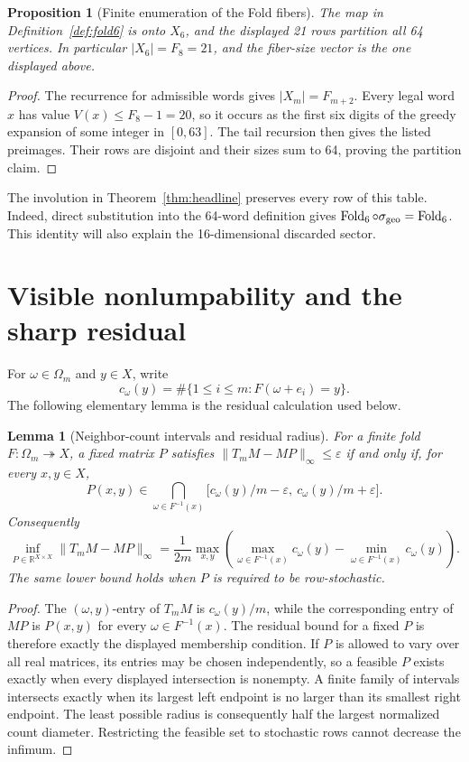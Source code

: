 \documentclass[12pt,a4paper]{article}
\theoremstyle{plain}
\newtheorem{proposition}[theorem]{Proposition}
\newtheorem{lemma}[theorem]{Lemma}
\theoremstyle{definition}
\numberwithin{equation}{section}
\newcommand{\Fold}{\operatorname{Fold}}
\newcommand{\RR}{\mathbb R}
\begin{document}
\begin{proposition}[Finite enumeration of the Fold fibers]\label{prop:fiber-enumeration}
The map in Definition~\ref{def:fold6} is onto \(X_6\), and the displayed 21 rows
partition all 64 vertices.  In particular \(|X_6|=F_8=21\), and the fiber-size vector
is the one displayed above.
\end{proposition}
\begin{proof}
The recurrence for admissible words gives \(|X_m|=F_{m+2}\).  Every legal word \(x\)
has value \(V(x)\le F_8-1=20\), so it occurs as the first six digits of the greedy
expansion of some integer in \([0,63]\).  The tail recursion then gives the listed
preimages.  Their rows are disjoint and their sizes sum to 64, proving the partition
claim.
\end{proof}

The involution in Theorem~\ref{thm:headline} preserves every row of this table.
Indeed, direct substitution into the 64-word definition gives
\(\Fold_6\circ\sigma_{\rm geo}=\Fold_6\).  This identity will also explain the
16-dimensional discarded sector.

\section{Visible nonlumpability and the sharp residual}\label{sec:residual}
For \(\omega\in\Omega_m\) and \(y\in X\), write
\[
c_\omega(y)=\#\{1\le i\le m:F(\omega+e_i)=y\}.
\]
The following elementary lemma is the residual calculation used below.

\begin{lemma}[Neighbor-count intervals and residual radius]\label{lem:residual}
For a finite fold \(F:\Omega_m\twoheadrightarrow X\), a fixed matrix \(P\) satisfies
\(\|T_mM-MP\|_\infty\le\varepsilon\) if and only if, for every \(x,y\in X\),
\[
P(x,y)\in\bigcap_{\omega\in F^{-1}(x)}
\bigl[c_\omega(y)/m-\varepsilon,\ c_\omega(y)/m+\varepsilon\bigr].
\]
Consequently
\[
\inf_{P\in\RR^{X\times X}}\|T_mM-MP\|_\infty
 =\frac{1}{2m}\max_{x,y}\left(\max_{\omega\in F^{-1}(x)}c_\omega(y)-\min_{\omega\in F^{-1}(x)}c_\omega(y)\right).
\]
The same lower bound holds when \(P\) is required to be row-stochastic.
\end{lemma}
\begin{proof}
The \((\omega,y)\)-entry of \(T_mM\) is \(c_\omega(y)/m\), while the corresponding
entry of \(MP\) is \(P(x,y)\) for every \(\omega\in F^{-1}(x)\).  The residual bound
for a fixed \(P\) is therefore exactly the displayed membership condition.  If \(P\) is
allowed to vary over all real matrices, its entries may be chosen independently, so a
feasible \(P\) exists exactly when every displayed intersection is nonempty.  A finite
family of intervals intersects exactly when its largest left endpoint is no larger than
its smallest right endpoint.  The least possible radius is consequently half the
largest normalized count diameter.  Restricting the feasible set to stochastic rows
cannot decrease the infimum.
\end{proof}
\end{document}
